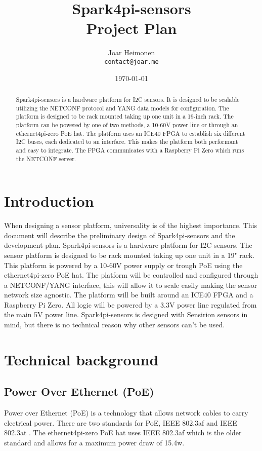 \documentclass[12pt]{article}
\author{
    Joar Heimonen\\
    \texttt{contact@joar.me}
}
\title{
    \textbf{Spark4pi-sensors}\\[0.5em]
    \large Project Plan
}
\date{\today}
\begin{document}
\maketitle

\begin{abstract}
    \noindent Spark4pi-sensors is a hardware platform for I2C sensors. It is designed to be scalable utilizing the NETCONF protocol and YANG data models for configuration.
    The platform is designed to be rack mounted taking up one unit in a 19-inch rack. The platform can be powered by one of two methods, a 10-60V power line or through an
    ethernet4pi-zero PoE hat. The platform uses an ICE40 FPGA to establish six different I2C buses, each dedicated to an interface. This makes the platform both performant and easy to integrate.
    The FPGA communicates with a Raspberry Pi Zero which runs the NETCONF server.

\end{abstract}

\pagebreak

\tableofcontents

\pagebreak


\section{Introduction}
When designing a sensor platform, universality is of the highest importance. This document will describe the preliminary design of Spark4pi-sensors and the development plan.
Spark4pi-sensors is a hardware platform for I2C sensors.
The sensor platform is designed to be rack mounted taking up one unit in a 19" rack. This platform is powered by a 10-60V power supply or trough PoE using the ethernet4pi-zero PoE hat.
The platform will be controlled and configured through a NETCONF/YANG interface, this will allow it to scale easily making the sensor network size agnostic.
The platform will be built around an ICE40 FPGA and a Raspberry Pi Zero. All logic will be powered by a 3.3V power line regulated from the main 5V power line.
Spark4pi-sensors is designed with Sensirion sensors in mind, but there is no technical reason why other sensors can't be used.


\section{Technical background}
\subsection{Power Over Ethernet (PoE)}
Power over Ethernet (PoE) is a technology that allows network cables to carry electrical power. 
There are two standards for PoE, IEEE 802.3af and IEEE 802.3at \cite{IEEEStandardsAssociation}. The ethernet4pi-zero PoE hat uses IEEE 802.3af which 
is the older standard and allows for a maximum power draw of 15.4w.
\end{document}
